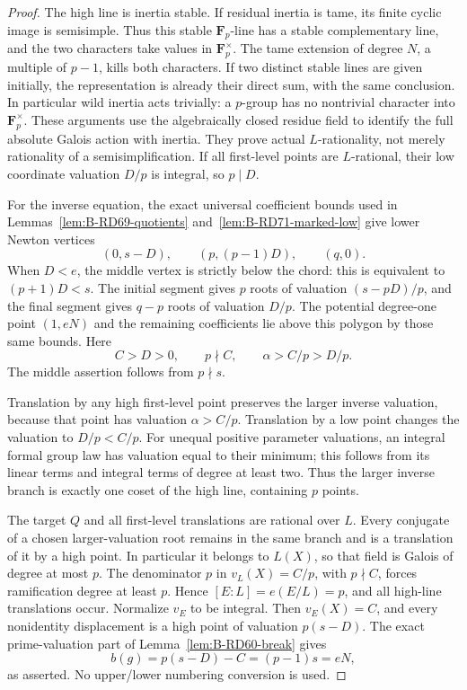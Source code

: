 \begin{proof}
The high line is inertia stable. If residual inertia is tame,
its finite cyclic image is semisimple. Thus this stable
\(\mathbf F_p\)-line has a stable complementary line, and the
two characters take values in \(\mathbf F_p^\times\).
The tame extension of degree \(N\), a multiple of \(p-1\),
kills both characters. If two distinct stable lines are given
initially, the representation is already their direct sum,
with the same conclusion. In particular wild inertia acts
trivially: a \(p\)-group has no nontrivial character into
\(\mathbf F_p^\times\). These arguments use the algebraically
closed residue field to identify the full absolute Galois
action with inertia. They prove actual \(L\)-rationality,
not merely rationality of a semisimplification.
If all first-level points are \(L\)-rational, their low coordinate
valuation \(D/p\) is integral, so \(p\mid D\).

For the inverse equation, the exact universal coefficient
bounds used in Lemmas~\ref{lem:B-RD69-quotients}
and~\ref{lem:B-RD71-marked-low} give lower Newton vertices
\[
 (0,s-D),\qquad (p,(p-1)D),\qquad(q,0).
 \tag{B-RD73.4}
\]
When \(D<e\), the middle vertex is strictly below the chord:
this is equivalent to \((p+1)D<s\).
The initial segment gives \(p\) roots of valuation \((s-pD)/p\),
and the final segment gives \(q-p\) roots of valuation \(D/p\).
The potential degree-one point \((1,eN)\) and the remaining
coefficients lie above this polygon by those same bounds.
Here
\[
 C>D>0,\qquad p\nmid C,
 \qquad \alpha>C/p>D/p.
 \tag{B-RD73.5}
\]
The middle assertion follows from \(p\nmid s\).

Translation by any high first-level point preserves the larger
inverse valuation, because that point has valuation \(\alpha>C/p\).
Translation by a low point changes the valuation to \(D/p<C/p\).
For unequal positive parameter valuations, an integral formal
group law has valuation equal to their minimum; this follows
from its linear terms and integral terms of degree at least two.
Thus the larger inverse branch is exactly one coset of the
high line, containing \(p\) points.

The target \(Q\) and all first-level translations are rational
over \(L\). Every conjugate of a chosen larger-valuation root
remains in the same branch and is a translation of it by a high
point. In particular it belongs to \(L(X)\), so that field is
Galois of degree at most \(p\). The denominator \(p\) in
\(v_L(X)=C/p\), with \(p\nmid C\), forces ramification degree
at least \(p\). Hence \([E:L]=e(E/L)=p\), and all high-line
translations occur. Normalize \(v_E\) to be integral.
Then \(v_E(X)=C\), and every nonidentity displacement is a
high point of valuation \(p(s-D)\).
The exact prime-valuation part of Lemma~\ref{lem:B-RD60-break}
gives
\[
 b(g)=p(s-D)-C=(p-1)s=eN,
\]
as asserted. No upper/lower numbering conversion is used.
\end{proof}

